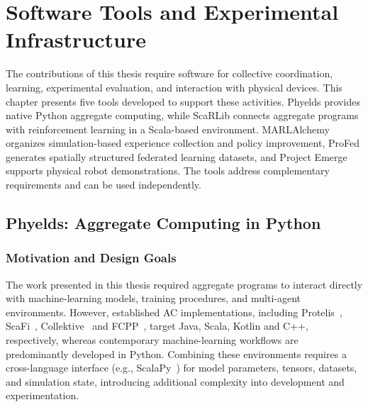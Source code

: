 \chapter{Software Tools and Experimental Infrastructure}
\label{chap:frameworks}
\minitoc

The contributions of this thesis require software for collective coordination,
 learning, experimental evaluation, and interaction with physical devices.
%
This chapter presents five tools developed to support these activities.
%
Phyelds provides native Python aggregate computing, while ScaRLib connects
 aggregate programs with reinforcement learning in a Scala-based environment.
%
MARLAlchemy organizes simulation-based experience collection and policy
 improvement, ProFed generates spatially structured federated learning
 datasets, and Project Emerge supports physical robot demonstrations.
%
The tools address complementary requirements and can be used independently.

\section{Phyelds: Aggregate Computing in Python}
\label{sec:phyelds}

\subsection{Motivation and Design Goals}

The work presented in this thesis required aggregate programs to interact
 directly with machine-learning models, training procedures, and multi-agent
 environments.
%
However, established \gls{AC} implementations, including 
 Protelis~\cite{DBLP:conf/sac/PianiniVB15}, 
 ScaFi~\cite{DBLP:journals/softx/CasadeiVAP22}, 
 Collektive~\cite{DBLP:conf/acsos/Cortecchia24}
 and FCPP~\cite{DBLP:journals/scp/AudritoT24}, 
 target Java, Scala, Kotlin and C++, respectively, 
 whereas contemporary machine-learning workflows are predominantly developed in Python.
%
Combining these environments requires a cross-language interface (e.g., ScalaPy~\cite{DBLP:conf/scala/LaddadS20}) 
 for model parameters, tensors, datasets, and simulation state, introducing additional
 complexity into development and experimentation.

